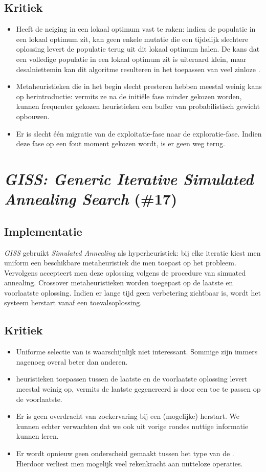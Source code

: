 \subsection{Kritiek}
\begin{itemize}
 \item Heeft de neiging in een lokaal optimum vast te raken: indien de populatie in een lokaal optimum zit, kan geen enkele mutatie die een tijdelijk slechtere oplossing levert de populatie terug uit dit lokaal optimum halen. De kans dat een volledige populatie in een lokaal optimum zit is uiteraard klein, maar desalniettemin kan dit algoritme resulteren in het toepassen van veel zinloze \abllh{}.
 \item Metaheuristieken die in het begin slecht presteren hebben meestal weinig kans op herintroductie: vermits ze na de initi\"ele fase minder gekozen worden, kunnen frequenter gekozen heuristieken een buffer van probabilistisch gewicht opbouwen.
 \item Er is slecht \'e\'en migratie van de exploitatie-fase naar de exploratie-fase. Indien deze fase op een fout moment gekozen wordt, is er geen weg terug.
\end{itemize}
\section{\emph{GISS: Generic Iterative Simulated Annealing Search} (\#17)}
\label{sss:giss}
\subsection{Implementatie}
\emph{GISS}\cite{chesc-giss} gebruikt \emph{Simulated Annealing}\cite{citeulike:1612433} als hyperheuristiek: bij elke iteratie kiest men uniform een beschikbare metaheuristiek die men toepast op het probleem. Vervolgens accepteert men deze oplossing volgens de procedure van simuated annealing. Crossover metaheuristieken worden toegepast op de laatste en voorlaatste oplossing. Indien er lange tijd geen verbetering zichtbaar is, wordt het systeem herstart vanaf een toevalsoplossing.
\subsection{Kritiek}
\begin{itemize}
 \item Uniforme selectie van \abllhn{} is waarschijnlijk niet interessant. Sommige \abllhn{} zijn immers nagenoeg overal beter dan anderen.
 \item \abco{} heuristieken toepassen tussen de laatste en de voorlaatste oplossing levert meestal weinig op, vermits de laatste gegenereerd is door een \abllh{} toe te passen op de voorlaatste.
 \item Er is geen overdracht van zoekervaring bij een (mogelijke) herstart. We kunnen echter verwachten dat we ook uit vorige rondes nuttige informatie kunnen leren.
 \item Er wordt opnieuw geen onderscheid gemaakt tussen het type van de \abllhn{}. Hierdoor verliest men mogelijk veel rekenkracht aan nutteloze operaties.
\end{itemize}
